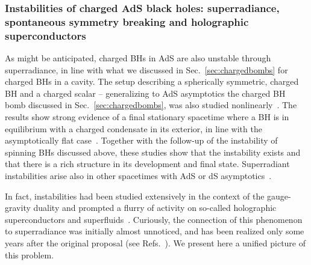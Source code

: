 \documentclass[11pt]{article}
\numberwithin{equation}{section} %
\begin{document}
\subsubsection{Instabilities of charged AdS black holes: superradiance, spontaneous symmetry breaking and holographic 
superconductors}\label{sec:breaking}

As might be anticipated, charged BHs in AdS are also unstable through superradiance, in line with what we discussed in Sec.~\ref{sec:chargedbombs} for charged BHs in a cavity. 
The setup describing a spherically symmetric, charged BH and a charged scalar -- generalizing to AdS 
asymptotics the charged BH bomb discussed in Sec.~\ref{sec:chargedbombs},
was also studied nonlinearly~\cite{Bosch:2016vcp,Dias:2016pma}. The results show strong evidence of a final stationary spacetime 
where a BH is in equilibrium with a charged condensate in its exterior, in line with the asymptotically flat 
case~\cite{Sanchis-Gual:2015lje,Sanchis-Gual:2016tcm}. Together with the follow-up of the instability of spinning BHs discussed above, these studies show that 
the instability exists and that there is a rich structure in its development and final state. Superradiant instabilities arise also in other spacetimes with
AdS or dS asymptotics~\cite{Gonzalez:2017shu,Burikham:2017gdm}.





In fact, instabilities had been studied extensively in the context of the gauge-gravity duality and prompted a flurry 
of activity on so-called holographic superconductors and superfluids~\cite{Hartnoll:2008vx,Hartnoll:2009sz}. Curiously, 
the connection of this phenomenon to superradiance was initially almost unnoticed, and has been realized only some years 
after the original proposal (see Refs.~\cite{Hartnoll:2011fn,Dias:2011tj,Basu:2010uz,Dias:2016pma}). We present here a unified 
picture of this problem.
\end{document}
